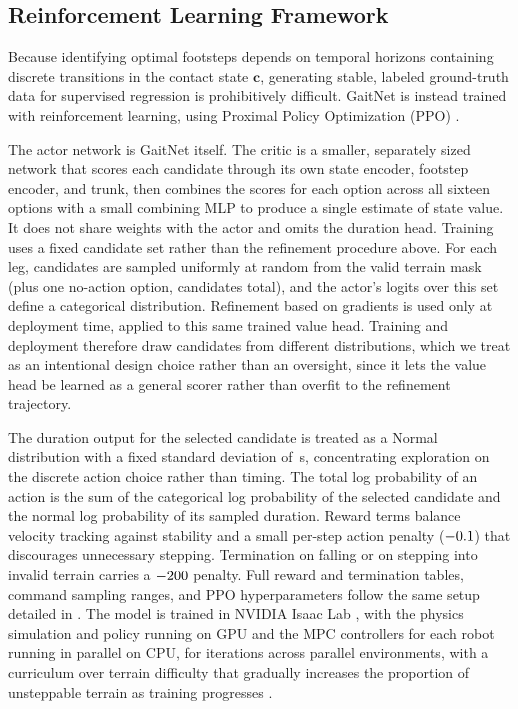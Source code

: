 \subsection{Reinforcement Learning Framework}
\label{subsec:methodology-gaitnet-training}

Because identifying optimal footsteps depends on temporal horizons
containing discrete transitions in the contact state $\mathbf{c}$,
generating stable, labeled ground-truth data for supervised
regression is prohibitively difficult. GaitNet is instead trained
with reinforcement learning, using Proximal Policy Optimization (PPO)
\cite{Schulman_proximal_2017}.

The actor network is GaitNet itself. The critic is a smaller,
separately sized network that scores each candidate through its own
state encoder, footstep encoder, and trunk, then combines the
scores for each option across all sixteen options with a small combining
MLP to produce a single estimate of state value. It does not share
weights with the actor and omits the duration head. Training uses a
fixed candidate set rather than the refinement procedure above. For
each leg, \numberstringnum{\corlTrainCandidatesPerLeg} candidates are
sampled uniformly at random from the valid terrain mask (plus one
no-action option, \corlTrainTotalCandidates{} candidates total), and
the actor's logits over this set define a categorical
distribution. Refinement based on gradients is used only at
deployment time, applied to this same trained value head. Training
and deployment therefore draw candidates from different
distributions, which we treat as an intentional design choice rather
than an oversight, since it lets the value head be learned as a
general scorer rather than overfit to the refinement trajectory.

The duration output for the selected candidate is treated as a
Normal distribution with a fixed standard deviation of
\corlDurationExploreStd\,s, concentrating exploration on the discrete
action choice rather than timing. The total log probability of an
action is the sum of the categorical log probability of the selected
candidate and the normal log probability of its sampled duration.
Reward terms balance velocity tracking against stability and a small
per-step action penalty ($-0.1$) that discourages
unnecessary stepping. Termination on falling or on stepping into
invalid terrain carries a $-200$ penalty. Full
reward and termination tables, command sampling ranges, and PPO
hyperparameters follow the same setup detailed in \cite{Sullivan2025}.
The model is trained in
NVIDIA Isaac Lab \cite{mittal_orbit_2023}, with the physics simulation
and policy running on GPU and the MPC controllers for each robot
running in parallel on CPU, for \corlTrainingIterations{} iterations
across \corlParallelEnvs{} parallel environments, with a curriculum
over terrain difficulty that gradually increases the proportion of
unsteppable terrain as training progresses \cite{Sullivan2025}.
